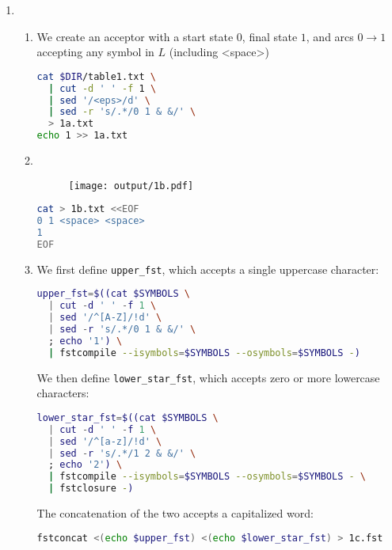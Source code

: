 \documentclass[a4paper,oneside,reqno]{amsart}
\begin{document}
\begin{enumerate}[label=\arabic*.]
  \item
    \begin{enumerate}[label=(\alph*)]
      \item
        We create an acceptor with a start state $0$, final state $1$, and
        arcs $0 \to 1$ accepting any symbol in $L$ (including <space>)
        \begin{lstlisting}[language=bash]
cat $DIR/table1.txt \
  | cut -d ' ' -f 1 \
  | sed '/<eps>/d' \
  | sed -r 's/.*/0 1 & &/' \
  > 1a.txt
echo 1 >> 1a.txt
        \end{lstlisting}

      \item~%
        \begin{figure}[ht!]
          \begin{center}
            \texttt{[image: output/1b.pdf]}
          \end{center}
        \end{figure}
        \begin{lstlisting}[language=bash]
cat > 1b.txt <<EOF
0 1 <space> <space>
1
EOF
        \end{lstlisting}

      \item We first define \texttt{upper\_fst}, which accepts a single
        uppercase character:
        \begin{lstlisting}[language=bash]
upper_fst=$((cat $SYMBOLS \
  | cut -d ' ' -f 1 \
  | sed '/^[A-Z]/!d' \
  | sed -r 's/.*/0 1 & &/' \
  ; echo '1') \
  | fstcompile --isymbols=$SYMBOLS --osymbols=$SYMBOLS -)
        \end{lstlisting}

        We then define \texttt{lower\_star\_fst}, which accepts zero or more
        lowercase characters:
        \begin{lstlisting}[language=bash]
lower_star_fst=$((cat $SYMBOLS \
  | cut -d ' ' -f 1 \
  | sed '/^[a-z]/!d' \
  | sed -r 's/.*/1 2 & &/' \
  ; echo '2') \
  | fstcompile --isymbols=$SYMBOLS --osymbols=$SYMBOLS - \
  | fstclosure -)
        \end{lstlisting}

        The concatenation of the two accepts a capitalized word:
        \begin{lstlisting}[language=bash]
fstconcat <(echo $upper_fst) <(echo $lower_star_fst) > 1c.fst
        \end{lstlisting}


\end{enumerate}
\end{enumerate}
\end{document}
